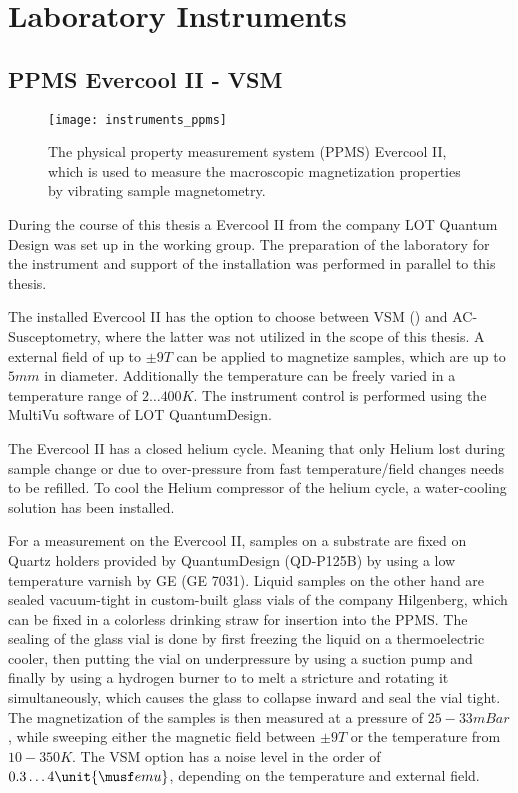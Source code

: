 \documentclass[\main/dresen_thesis.tex]{subfiles}
\begin{document}
\section{Laboratory Instruments}
  \subsection{PPMS Evercool II - VSM}
    \label{ch:instruments:laboratoryInstruments:vsm}
      \begin{figure}[ht]
        \centering
        \texttt{[image: instruments\_ppms]}
        \caption{\label{fig:appendix:instruments:ppms}The physical property measurement system (PPMS) Evercool II, which is used to measure the macroscopic magnetization properties by vibrating sample magnetometry.}
      \end{figure}
      During the course of this thesis a Evercool II from the company LOT Quantum Design was set up in the working group.
      The preparation of the laboratory for the instrument and support of the installation was performed in parallel to this thesis.

      The installed Evercool II has the option to choose between VSM () and AC-Susceptometry, where the latter was not utilized in the scope of this thesis.
      A external field of up to $\pm 9 \unit{T}$ can be applied to magnetize samples, which are up to $5 \unit{mm}$ in diameter.
      Additionally the temperature can be freely varied in a temperature range of $2 \ldots 400 \unit{K}$.
      The instrument control is performed using the MultiVu software of LOT QuantumDesign.

      The Evercool II has a closed helium cycle.
      Meaning that only Helium lost during sample change or due to over-pressure from fast temperature/field changes needs to be refilled.
      To cool the Helium compressor of the helium cycle, a water-cooling solution has been installed.

      For a measurement on the Evercool II, samples on a substrate are fixed on Quartz holders provided by QuantumDesign (QD-P125B) by using a low temperature varnish by GE (GE 7031).
      Liquid samples on the other hand are sealed vacuum-tight in custom-built glass vials of the company Hilgenberg, which can be fixed in a colorless drinking straw for insertion into the PPMS.
      The sealing of the glass vial is done by first freezing the liquid on a thermoelectric cooler, then putting the vial on underpressure by using a suction pump and finally by using a hydrogen burner to to melt a stricture and rotating it simultaneously, which causes the glass to collapse inward and seal the vial tight.
      The magnetization of the samples is then measured at a pressure of $25 - 33 \unit{mBar}$, while sweeping either the magnetic field between $\pm 9 \unit{T}$ or the temperature from $10 - 350 \unit{K}$.
      The VSM option has a noise level in the order of $0.3 \ldots 4 \unit{\musf emu}$, depending on the temperature and external field.
\end{document}
